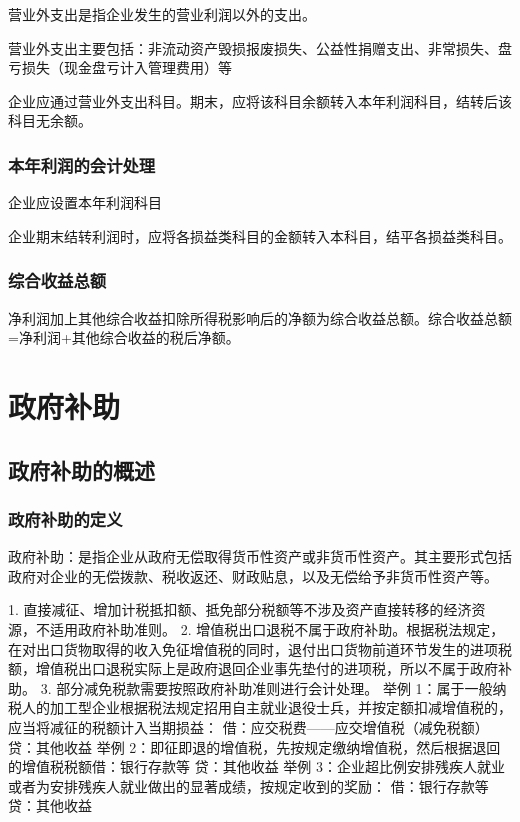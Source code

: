 \documentclass[UTF8,12pt]{ctexart}
\numberwithin{equation}{section} %
\numberwithin{figure}{section}
\numberwithin{table}{section}
\begin{document}
	营业外支出是指企业发生的营业利润以外的支出。
	
	营业外支出主要包括：非流动资产毁损报废损失、公益性捐赠支出、非常损失、盘亏损失（现金盘亏计入管理费用）等
	
	企业应通过营业外支出科目。期末，应将该科目余额转入本年利润科目，结转后该科目无余额。
	\subsubsection{本年利润的会计处理}
	企业应设置本年利润科目
	
	企业期末结转利润时，应将各损益类科目的金额转入本科目，结平各损益类科目。
	\subsubsection{综合收益总额}
	净利润加上其他综合收益扣除所得税影响后的净额为综合收益总额。综合收益总额=净利润+其他综合收益的税后净额。
	
	
	\newpage
	\section{政府补助}
	\subsection{政府补助的概述}
	\subsubsection{政府补助的定义}
	政府补助：是指企业从政府无偿取得货币性资产或非货币性资产。其主要形式包括政府对企业的无偿拨款、税收返还、财政贴息，以及无偿给予非货币性资产等。
	
	1.	直接减征、增加计税抵扣额、抵免部分税额等不涉及资产直接转移的经济资源，不适用政府补助准则。
	2.	增值税出口退税不属于政府补助。根据税法规定，在对出口货物取得的收入免征增值税的同时，退付出口货物前道环节发生的进项税额，增值税出口退税实际上是政府退回企业事先垫付的进项税，所以不属于政府补助。
	3.	部分减免税款需要按照政府补助准则进行会计处理。
	举例 1：属于一般纳税人的加工型企业根据税法规定招用自主就业退役士兵，并按定额扣减增值税的，应当将减征的税额计入当期损益：
	借：应交税费——应交增值税（减免税额）贷：其他收益
	举例 2：即征即退的增值税，先按规定缴纳增值税，然后根据退回的增值税税额借：银行存款等
	贷：其他收益
	举例 3：企业超比例安排残疾人就业或者为安排残疾人就业做出的显著成绩，按规定收到的奖励：
	借：银行存款等贷：其他收益
	
\end{document}
